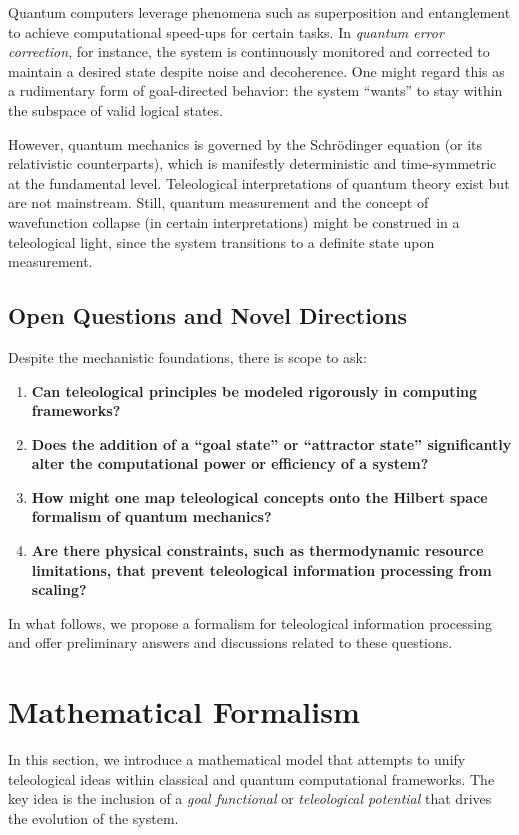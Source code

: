 \documentclass[12pt]{article}
\begin{document}
Quantum computers leverage phenomena such as superposition and entanglement to achieve computational speed-ups for certain tasks. In \emph{quantum error correction}, for instance, the system is continuously monitored and corrected to maintain a desired state despite noise and decoherence. One might regard this as a rudimentary form of goal-directed behavior: the system ``wants'' to stay within the subspace of valid logical states.

However, quantum mechanics is governed by the Schrödinger equation (or its relativistic counterparts), which is manifestly deterministic and time-symmetric at the fundamental level. Teleological interpretations of quantum theory exist but are not mainstream. Still, quantum measurement and the concept of wavefunction collapse (in certain interpretations) might be construed in a teleological light, since the system transitions to a definite state upon measurement. 

\subsection{Open Questions and Novel Directions}

Despite the mechanistic foundations, there is scope to ask:
\begin{enumerate}[label=(\roman*)]
    \item \textbf{Can teleological principles be modeled rigorously in computing frameworks?} 
    \item \textbf{Does the addition of a ``goal state'' or ``attractor state'' significantly alter the computational power or efficiency of a system?}
    \item \textbf{How might one map teleological concepts onto the Hilbert space formalism of quantum mechanics?}
    \item \textbf{Are there physical constraints, such as thermodynamic resource limitations, that prevent teleological information processing from scaling?}
\end{enumerate}

In what follows, we propose a formalism for teleological information processing and offer preliminary answers and discussions related to these questions.

\section{Mathematical Formalism}

In this section, we introduce a mathematical model that attempts to unify teleological ideas within classical and quantum computational frameworks. The key idea is the inclusion of a \emph{goal functional} or \emph{teleological potential} that drives the evolution of the system.
\end{document}
